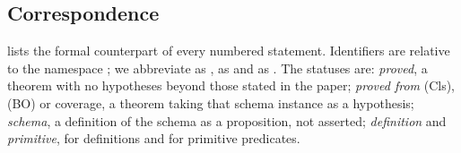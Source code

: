 \subsection{Correspondence}\label{app:formalization:master-mapping}

 lists the formal counterpart of every
numbered statement.  Identifiers are relative to the namespace
; we abbreviate
 as ,
 as  and
 as .  The statuses are:
\emph{proved}, a theorem with no hypotheses beyond those stated in the
paper; \emph{proved from} (Cls), (BO) or coverage, a theorem taking that
schema instance as a hypothesis; \emph{schema}, a definition of the
schema as a proposition, not asserted; \emph{definition} and
\emph{primitive}, for definitions and for primitive predicates.

